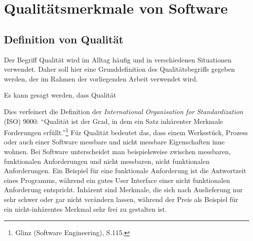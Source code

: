 \chapter{Qualitätsmerkmale von Software}
\label{cha:qualitaetsmerkmale}

%
%
    \section{Definition von Qualität}
    \label{sec:definitionQualitaet}

        Der Begriff Qualität wird im Alltag häufig und in verschiedenen Situationen verwendet. Daher soll hier eine Grunddefinition des Qualitätsbegriffs gegeben werden, der im Rahmen der vorliegenden Arbeit verwendet wird.

        Es kann gesagt werden, dass Qualität


        Dies verfeinert die Definition der \emph{International Organisation for Standardization} (ISO) 9000: \enquote{Qualität ist der Grad, in dem ein Satz inhärenter Merkmale Forderungen erfüllt.}\footnote{Glinz (Software Engineering), S.115.} Für Qualität bedeutet das, dass einem Werksstück, Prozess oder auch einer Software messbare und nicht messbare Eigenschaften inne wohnen. Bei Software unterscheidet man beispielsweise zwischen messbaren, funktionalen Anforderungen und nicht messbaren, nicht funktionalen Anforderungen. Ein Beispiel für eine funktionale Anforderung ist die Antwortzeit eines Programms, während ein gutes User Interface einer nicht funktionalen Anforderung entspricht. Inhärent sind Merkmale, die sich nach Auslieferung nur sehr schwer oder gar nicht verändern lassen, während der Preis als Beispiel für ein nicht-inhärentes Merkmal sehr frei zu gestalten ist.

